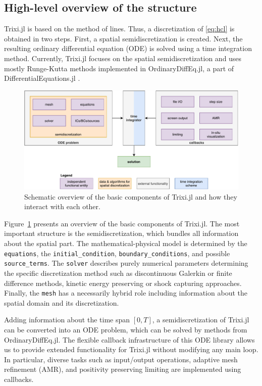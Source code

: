 \documentclass{juliacon}
\newcommand{\trixi}{Trixi.jl\xspace}
\begin{document}
\subsection{High-level overview of the structure}

\trixi is based on the method of lines. Thus, a discretization of \eqref{eq:hcl}
is obtained in two steps. First, a spatial semidiscretization is created. Next,
the resulting ordinary differential equation (ODE) is solved using a time
integration method. Currently, \trixi focuses on the spatial semidiscretization
and uses mostly Runge-Kutta methods implemented in OrdinaryDiffEq.jl, a part
of DifferentialEquations.jl \cite{rackauckas2017differentialequations}.

\begin{figure}[htbp]
  \includegraphics[width=\linewidth]{../figures/trixi_global_overview}
  \caption{Schematic overview of the basic components of \trixi and how they
           interact with each other.}
  \label{fig:trixi_global_overview}
\end{figure}

Figure~\ref{fig:trixi_global_overview} presents an overview of the basic
components of \trixi. The most important structure is the semidiscretization,
which bundles all information about the spatial part. The mathematical-physical
model is determined by the \lstinline{equations}, the \lstinline{initial_condition},
\lstinline{boundary_conditions}, and possible \lstinline{source_terms}. The
\lstinline{solver} describes purely numerical parameters determining the specific
discretization method such as discontinuous Galerkin or finite difference
methods, kinetic energy preserving or shock capturing approaches. Finally, the
\lstinline{mesh} has a necessarily hybrid role including information about the
spatial domain and its discretization.

Adding information about the time span $[0, T]$, a semidiscretization of \trixi
can be converted into an ODE problem, which can be solved by methods from
OrdinaryDiffEq.jl. The flexible callback infrastructure of this ODE library
allows us to provide extended functionality for \trixi without modifying any
main loop. In particular, diverse tasks such as input/output operations, adaptive
mesh refinement (AMR), and positivity preserving limiting are implemented using
callbacks.
\end{document}
